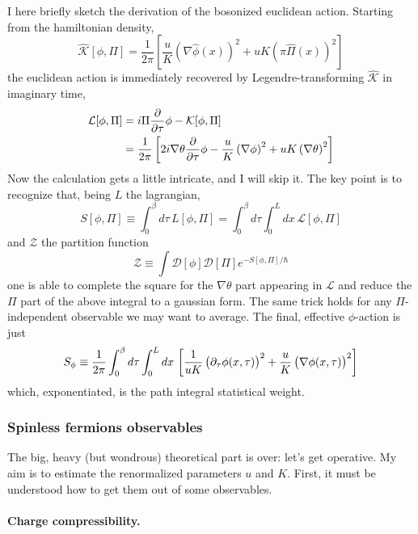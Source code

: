 I here briefly sketch the derivation of the bosonized euclidean action. Starting from the hamiltonian density,
\[
	\hat{\mathcal{K}}[\phi, \Pi] = \frac{1}{2\pi} \left[
			\frac{u}{K} \left( \nabla \hat \phi(x) \right)^2 + uK \left( \pi \hat \Pi(x) \right)^2
	\right]
\]
the euclidean action is immediately recovered by Legendre-transforming $\hat{\mathcal{K}}$ in imaginary time,
\[
	\begin{aligned}
		\mathcal{L}[\phi, \Pi] &= i \Pi \pdv{\tau} \phi - \mathcal{K} [\phi, \Pi] \\
		&= \frac{1}{2\pi} \left[
			2i \nabla \theta \pdv{\tau} \phi
			- \frac{u}{K} \left( \nabla \phi \right)^2 + uK \left( \nabla \theta \right)^2
		\right]
	\end{aligned}
\]
Now the calculation gets a little intricate, and I will skip it. The key point is to recognize that, being $L$ the lagrangian,
\[
	S[\phi, \Pi] \equiv \int_0^\beta d\tau \, L[\phi, \Pi] = \int_0^\beta d\tau \int_0^L dx \,  \mathcal{L}[\phi, \Pi]
\]
and $\mathcal{Z}$ the partition function
\[
	\mathcal{Z} \equiv \int \mathcal{D}[\phi] \mathcal{D}[\Pi] e^{-S[\phi, \Pi] /\hbar}
\]
one is able to complete the square for the $\nabla \theta$ part appearing in $\mathcal{L}$ and reduce the $\Pi$ part of the above integral to a gaussian form. The same trick holds for any $\Pi$-independent observable we may want to average. The final, effective $\phi$-action is just
\begin{equation}\label{eq:phi-action}
	S_\phi \equiv \frac{1}{2\pi} \int_0^\beta d\tau \int_0^L dx \, \left[
		\frac{1}{uK} \left(
			\vphantom{A^A}
			\partial_\tau \phi(x,\tau)
		\right)^2 + \frac{u}{K} \left(
			\vphantom{A^A}
			\nabla \phi(x,\tau) 
		\right)^2
	\right]
\end{equation}
which, exponentiated, is the path integral statistical weight.

\subsubsection{Spinless fermions observables}

The big, heavy (but wondrous) theoretical part is over: let's get operative. My aim is to estimate the renormalized parameters $u$ and $K$. First, it must be understood how to get them out of some observables.

\paragraph{Charge compressibility.}

